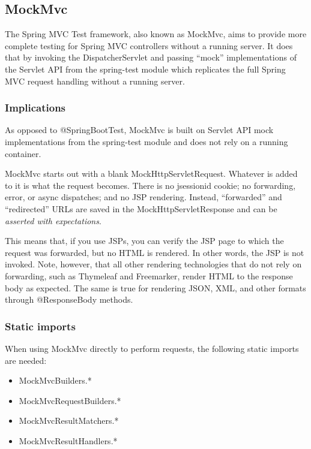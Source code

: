 \documentclass{scrartcl}
\begin{document}
\subsection{MockMvc}

The Spring MVC Test framework, also known as MockMvc, aims to provide more complete testing for Spring MVC controllers without a running server. It does that by invoking the DispatcherServlet and passing “mock” implementations of the Servlet API from the spring-test module which replicates the full Spring MVC request handling without a running server.

\subsubsection{Implications}

As opposed to @SpringBootTest, MockMvc is built on Servlet API mock implementations from the spring-test module and does not rely on a running container.

MockMvc starts out with a blank MockHttpServletRequest. Whatever is added to it is what the request becomes. There is no jsessionid cookie; no forwarding, error, or async dispatches; and no JSP rendering. Instead, “forwarded” and “redirected” URLs are saved in the MockHttpServletResponse and can be \textit{asserted with expectations}.

This means that, if you use JSPs, you can verify the JSP page to which the request was forwarded, but no HTML is rendered. In other words, the JSP is not invoked. Note, however, that all other rendering technologies that do not rely on forwarding, such as Thymeleaf and Freemarker, render HTML to the response body as expected. The same is true for rendering JSON, XML, and other formats through @ResponseBody methods.

\subsubsection{Static imports}

When using MockMvc directly to perform requests, the following static imports are needed:

\begin{itemize}
    \item MockMvcBuilders.*

    \item MockMvcRequestBuilders.*

    \item MockMvcResultMatchers.*

    \item MockMvcResultHandlers.*
\end{itemize}
\end{document}
